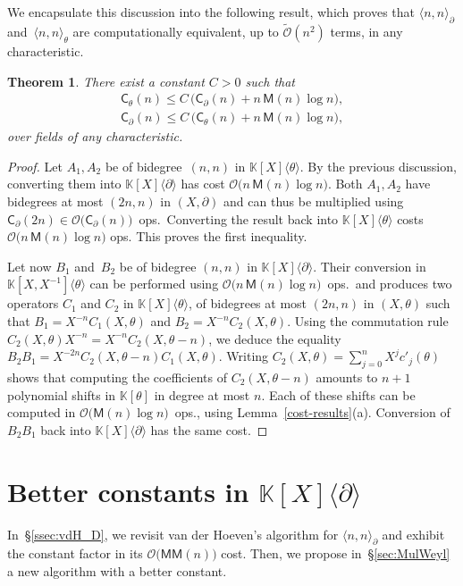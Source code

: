 \documentclass{sig-alt-full}
\newcommand{\x}{X}
\newcommand{\Tx}{\theta}
\newcommand{\Dx}{\partial}
\newcommand{\bigO}{{\mathcal{O}}}
\newcommand{\bigOsoft}{\tilde{\mathcal{O}}}
\newcommand{\MM}{\mathsf{MM}}
\def\OMul#1#2#3{\langle #1,#2 \rangle_{#3}}
\newcommand{\sC}{\mathsf{C}}
\newcommand{\sM}{\mathsf{M}}
\newcommand{\bK}{\mathbb{K}}
\newtheorem{theorem}{Theorem}
\begin{document}
We encapsulate this discussion into the following result, which proves that $\OMul nn\Dx$ and~$\OMul nn\Tx$ are computationally equivalent, up to $\bigOsoft(n^2)$ terms, in any characteristic.

\begin{theorem}
 There exist a constant $C>0$ such that
\begin{align*}
\sC_\Tx(n) \leq C\,\bigl(\sC_\Dx(n) + n \, \sM(n) \log n\bigr), \\
\sC_\Dx(n) \leq C\,\bigl(\sC_\Tx(n) + n \, \sM(n) \log n\bigr) ,
\end{align*}
\vskip-1pt
over fields of any characteristic.
\end{theorem}

\begin{proof}
Let $A_1,A_2$ be of bidegree~$(n,n)$ in $\bK[\x]\langle \Tx \rangle$.
By the previous discussion, converting them into $\bK[\x]\langle \Dx \rangle$ has cost $\bigO\bigl(n \, \sM(n) \log n\bigr)$.
Both $A_1,A_2$ have bidegrees at most $(2n,n)$ in $(\x,\Dx)$ and can thus be multiplied using $\sC_\Dx(2n) \in \bigO\bigl(\sC_\Dx(n)\bigr)$~ops.\ 
Converting the result back into $\bK[\x]\langle \Tx \rangle$ costs $\bigO\bigl(n \, \sM(n) \log n\bigr)$ ops.
This proves the first inequality.

Let now $B_1$ and~$B_2$ be of bidegree $(n,n)$ in $\bK[\x]\langle \Dx \rangle$.
Their conversion in $\bK[\x,\x^{-1}]\langle \Tx \rangle$ can be performed using $\bigO\bigl(n \, \sM(n) \log n\bigr)$~ops.\ and produces  two operators $C_1$ and $C_2$ in $\bK[\x]\langle \Tx \rangle$, of bidegrees at most $(2n,n)$ in $(\x,\Tx)$ such that $B_1 =\x^{-n} C_1(\x,\Tx)$ and $B_2 =\x^{-n} C_2(\x,\Tx)$. 
Using the commutation rule $C_2(\x,\Tx)  \x^{-n} = \x^{-n} C_2(\x,\Tx-n)$, we deduce the equality $B_2 B_1 =  \x^{-2n} C_2 (\x,\Tx-n) C_1(\x,\Tx)$.
Writing $C_2(\x,\Tx) = \sum_{j=0}^n \x^j c'_j(\Tx)$ shows that computing the coefficients of $C_2 (\x,\Tx-n)$ amounts to $n+1$ polynomial shifts in $\bK[\Tx]$ in degree at most $n$.
Each of these shifts can be computed in $\bigO\bigl(\sM(n) \log n\bigr)$~ops., using Lemma~\ref{cost-results}(a).
Conversion of $B_2B_1$ back into $\bK[\x]\langle \Dx \rangle$ has the same cost.
\end{proof}

\section{Better constants in $\bK[\x]\langle\Dx\rangle$}
\label{sec:better-constants}
In~\S\ref{ssec:vdH_D}, we revisit van der Hoeven's algorithm for $\OMul nn\Dx$ and exhibit the constant factor in its $\bigO\bigl(\MM(n)\bigr)$ cost. Then, we propose in~\S\ref{sec:MulWeyl} a new algorithm with a better constant.
\end{document}
